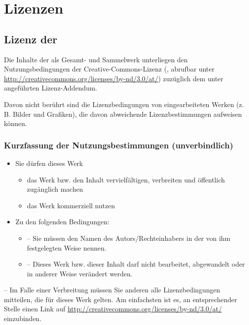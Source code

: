 \section{Lizenzen}

\subsection{Lizenz der \texorpdfstring{{\AASS}}{AASS}}

Die Inhalte der {\AASS} als Gesamt- und Sammelwerk unterliegen
den Nutzungsbedingungen der Creative-Commons-Lizenz  (,
abrufbar
unter
\url{http://creativecommons.org/licenses/by-nd/3.0/at/})
zuzüglich dem unter 
angeführten Lizenz-Addendum.

Davon nicht berührt sind die Lizenzbedingungen von eingearbeiteten Werken
(z.\,B. Bilder und Grafiken), die davon abweichende
Lizenzbestimmungen aufweisen können.

\subsubsection{Kurzfassung der Nutzungsbestimmungen (unverbindlich)}

\begin{itemize}
  \item Sie dürfen dieses Werk
  \begin{itemize}
    \item das Werk bzw. den Inhalt vervielfältigen, verbreiten und öffentlich zugänglich machen
    \item das Werk kommerziell nutzen
  \end{itemize}
  \item Zu den folgenden Bedingungen:
  \begin{itemize}
    \item {} -- Sie müssen den Namen des
    Autors/Rechteinhabers in der von ihm festgelegten Weise
    nennen.
    \item {} -- Dieses Werk bzw. dieser
    Inhalt darf nicht bearbeitet, abgewandelt oder in
    anderer Weise verändert werden.
  \end{itemize}
\end{itemize}
 -- Im Falle einer Verbreitung müssen Sie
anderen alle Lizenzbedingungen mitteilen, die für dieses
Werk gelten. Am einfachsten ist es, an entsprechender Stelle
einen Link auf \url{http://creativecommons.org/licenses/by-nd/3.0/at/} einzubinden.

